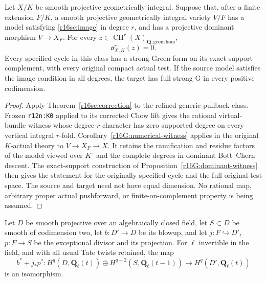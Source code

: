 \begin{corollary}
\label{r16sc:actual}
Let $X/K$ be smooth projective geometrically integral. Suppose
that, after a finite extension $F/K$, a smooth projective
geometrically integral variety $V/F$ has a model satisfying
\eqref{r16sc:image} in degree $r$, and has a projective dominant
morphism $V\to X_F$. For every
$z\in\operatorname{CH}^r(X)_{\mathbf Q,\mathrm{geom\,hom}}$,
\[
                         \mathfrak o_{X,K}^r(z)=0.
 \tag{SC16.8}\label{r16sc:actual-zero}
\]
Every specified cycle in this class has a strong Green form on
its exact support complement, with every original compact actual
test. If the source model satisfies the image condition in all
degrees, the target has full strong G in every positive codimension.
\end{corollary}

\begin{proof}
Apply Theorem~\ref{r16sc:correction} to the refined generic
pullback class. Frozen \texttt{r12n:K0} applied to its corrected
Chow lift gives the rational virtual-bundle witness whose degree-$r$
character has zero supported degree on every vertical integral
$r$-fold. Corollary~\ref{r16G:numerical-witness} applies in the
original $K$-actual theory to $V\to X_F\to X$. It retains the
ramification and residue factors of the model viewed over
$K^\circ$ and the complete degrees in dominant Bott--Chern descent.
The exact-support construction of
Proposition~\ref{r16G:dominant-witness} then gives the statement
for the originally specified cycle and the full original test space.
The source and target need not have equal dimension. No rational
map, arbitrary proper actual pushforward, or finite-on-complement
property is being assumed.
\end{proof}

\begin{lemma}
\label{r16sc:etale-blowup}
Let $D$ be smooth projective over an algebraically closed field,
let $S\subset D$ be smooth of codimension two, let
$b:D'\to D$ be its blowup, and let $j:F\hookrightarrow D'$,
$p:F\to S$ be the exceptional divisor and its projection.
For $\ell$ invertible in the field, and with all usual Tate
twists retained, the map
\[
 b^*+j_*p^*:
 H^q(D,\mathbf Q_\ell(t))\oplus
 H^{q-2}(S,\mathbf Q_\ell(t-1))
               \longrightarrow H^q(D',\mathbf Q_\ell(t))
 \tag{SC16.9}\label{r16sc:blowup-cohomology}
\]
is an isomorphism.
\end{lemma}

